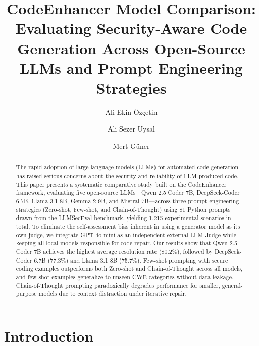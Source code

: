 \documentclass[runningheads]{llncs}
\begin{document}
\title{CodeEnhancer Model Comparison: Evaluating Security-Aware Code Generation Across Open-Source LLMs and Prompt Engineering Strategies}


\author{Ali Ekin Özçetin \and Ali Sezer Uysal \and Mert Güner}



\maketitle

\begin{abstract}
The rapid adoption of large language models (LLMs) for automated code generation has raised serious concerns about the security and reliability of LLM-produced code. This paper presents a systematic comparative study built on the CodeEnhancer framework, evaluating five open-source LLMs---Qwen 2.5 Coder 7B, DeepSeek-Coder 6.7B, Llama 3.1 8B, Gemma 2 9B, and Mistral 7B---across three prompt engineering strategies (Zero-shot, Few-shot, and Chain-of-Thought) using 81 Python prompts drawn from the LLMSecEval benchmark, yielding 1,215 experimental scenarios in total. To eliminate the self-assessment bias inherent in using a generator model as its own judge, we integrate GPT-4o-mini as an independent external LLM-Judge while keeping all local models responsible for code repair. Our results show that Qwen 2.5 Coder 7B achieves the highest average resolution rate (80.2\%), followed by DeepSeek-Coder 6.7B (77.3\%) and Llama 3.1 8B (75.7\%). Few-shot prompting with secure coding examples outperforms both Zero-shot and Chain-of-Thought across all models, and few-shot examples generalize to unseen CWE categories without data leakage. Chain-of-Thought prompting paradoxically degrades performance for smaller, general-purpose models due to context distraction under iterative repair.
\end{abstract}

\section{Introduction}
\label{sec:intro}
\end{document}

